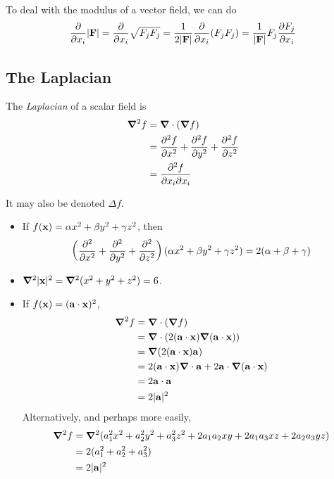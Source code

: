 \documentclass{../../template/note}
\begin{document}
    To deal with the modulus of a vector field, we can do
    \begin{align*}
        \pd{}{x_i} |\V F| = \pd{}{x_i} \sqrt{F_jF_j} = \frac{1}{2|\V F|} \pd{}{x_i} (F_jF_j) = \frac{1}{|\V F|}F_j \pd{F_j}{x_i}
    \end{align*}
    
    \subsection{The Laplacian}

    \begin{definition*}
        The \emph{Laplacian} of a scalar field is
        \begin{align*}
            \grad^2 f &= \grad \cdot (\grad f) \\
            &= \pd{^2f}{x^2} + \pd{^2f}{y^2} + \pd{^2f}{z^2} \\
            &= \pd{^2f}{x_i\partial x_i}
        \end{align*}
    \end{definition*}
    It may also be denoted \(\Delta f\).
    
    \begin{example*}
        \begin{itemize}
            \item If \(f(\V x) = \alpha x^2 + \beta y^2 + \gamma z^2\), then
            \begin{align*}
                \left(\pd{^2}{x^2} + \pd{^2}{y^2} + \pd{^2}{z^2}\right)(\alpha x^2 + \beta y^2 + \gamma z^2) = 2(\alpha + \beta + \gamma)
            \end{align*}
            \item \(\grad^2 |\V x|^2 = \grad^2(x^2+y^2+z^2) = 6\).
            \item If \(f(\V x) = (\V a \cdot \V x)^2\),
            \begin{align*}
                \grad^2 f &= \grad \cdot (\grad f) \\
                &= \grad \cdot (2(\V a \cdot \V x)\grad(\V a \cdot \V x)) \\
                &= \grad (2(\V a \cdot \V x)\V a) \\
                &= 2(\V a \cdot \V x)\grad \cdot \V a + 2 \V a \cdot \grad(\V a \cdot \V x) \\
                &= 2 \V a \cdot \V a \\
                &= 2|\V a|^2
            \end{align*}
            Alternatively, and perhaps more easily,
            \begin{align*}
                \grad^2 f &= \grad^2(a_1^2x^2 + a_2^2y^2 + a_3^2z^2 + 2a_1a_2xy + 2a_1a_3xz + 2a_2a_3yz) \\
                &= 2(a_1^2 + a_2^2 + a_3^2) \\
                &= 2|\V a|^2
            \end{align*}
        \end{itemize}
    \end{example*}
    
\end{document}
